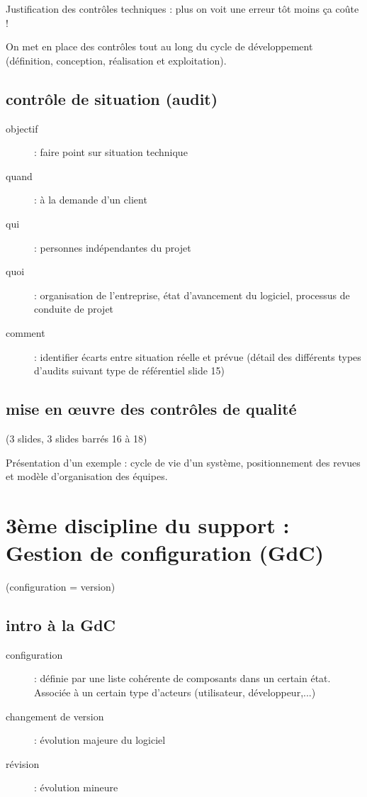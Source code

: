 Justification des contrôles techniques : plus on voit une erreur tôt moins ça coûte !

On met en place des contrôles tout au long du cycle de développement (définition, conception, réalisation et exploitation).

	\subsection{contrôle de situation (audit)}
	\begin{description}
		\item[objectif] : faire point sur situation technique
		\item[quand] : à la demande d'un client
		\item[qui] : personnes indépendantes du projet
		\item[quoi] : organisation de l’entreprise, état d’avancement du logiciel, processus de conduite de projet
		\item[comment] : identifier écarts entre situation réelle et prévue
(détail des différents types d’audits suivant type de référentiel slide 15)
	\end{description}

	\subsection{mise en \oe{}uvre des contrôles de qualité}

	(3 slides, 3 slides barrés 16 à 18)

	Présentation d’un exemple : cycle de vie d’un système, positionnement des revues et modèle d’organisation des équipes.

\section{3ème discipline du support : Gestion de configuration (GdC)}

(configuration = version)

	\subsection{intro à la GdC}
	\begin{description}
		\item[configuration] : définie par une liste cohérente de composants dans un certain état. Associée à un certain type d’acteurs (utilisateur, développeur,...)
		\item[changement de version] : évolution majeure du logiciel
		\item[révision] : évolution mineure
	\end{description}

